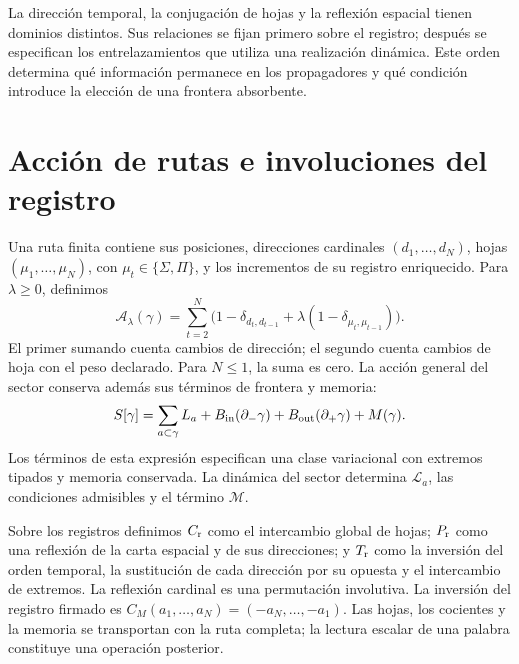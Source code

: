 La dirección temporal, la conjugación de hojas y la reflexión espacial
tienen dominios distintos. Sus relaciones se fijan primero sobre el registro;
después se especifican los entrelazamientos que utiliza una realización
dinámica. Este orden determina qué información permanece en los propagadores
y qué condición introduce la elección de una frontera absorbente.

\section{Acción de rutas e involuciones del registro}
\label{x_reciprocidad:vii:subsec:accion-bidireccional}

Una ruta finita contiene sus posiciones, direcciones cardinales
\((d_1,\ldots,d_N)\), hojas \((\mu_1,\ldots,\mu_N)\), con
\(\mu_t\in\{\Sigma,\Pi\}\), y los incrementos de su registro
enriquecido. Para \(\lambda\geq0\), definimos
\begin{equation}
 \mathcal A_\lambda(\gamma)
 =\sum_{t=2}^N
 \bigl(1-\delta_{d_t,d_{t-1}}
       +\lambda(1-\delta_{\mu_t,\mu_{t-1}})\bigr).
 \label{x_reciprocidad:vii:eq:accion-ruta-bidireccional}
\end{equation}
El primer sumando cuenta cambios de dirección; el segundo cuenta cambios
de hoja con el peso declarado. Para \(N\leq1\), la suma es cero.
La acción general del sector conserva además sus términos de frontera y
memoria:
\begin{equation}
 \mathcal S[\gamma]
 =\sum_{a\subset\gamma}\mathcal L_a
  +\mathcal B_{\rm in}(\partial_-\gamma)
  +\mathcal B_{\rm out}(\partial_+\gamma)
  +\mathcal M(\gamma).
 \label{x_reciprocidad:vii:eq:accion-enriquecida-frontera}
\end{equation}
Los términos de esta expresión especifican una clase variacional con
extremos tipados y memoria conservada. La dinámica del sector determina
\(\mathcal L_a\), las condiciones admisibles y el término \(\mathcal M\).

Sobre los registros definimos \(\mathcal C_{\rm r}\) como el intercambio
global de hojas; \(\mathcal P_{\rm r}\) como una reflexión de la carta
espacial y de sus direcciones; y \(\mathcal T_{\rm r}\) como la inversión
del orden temporal, la sustitución de cada dirección por su opuesta y el
intercambio de extremos. La reflexión cardinal es una permutación involutiva.
La inversión del registro firmado es
\(C_M(a_1,\ldots,a_N)=(-a_N,\ldots,-a_1)\).
Las hojas, los cocientes y la memoria se transportan con la ruta completa;
la lectura escalar de una palabra constituye una operación posterior.

